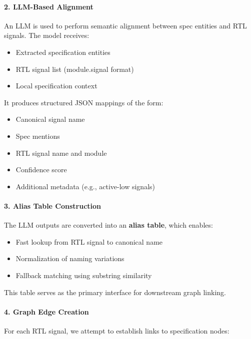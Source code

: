 \documentclass[12pt,a4paper]{article}
\begin{document}
\paragraph{2. LLM-Based Alignment}

An LLM is used to perform semantic alignment between spec entities and RTL
signals. The model receives:

\begin{itemize}[leftmargin=*]
  \item Extracted specification entities
  \item RTL signal list (module.signal format)
  \item Local specification context
\end{itemize}

It produces structured JSON mappings of the form:

\begin{itemize}[leftmargin=*]
  \item Canonical signal name
  \item Spec mentions
  \item RTL signal name and module
  \item Confidence score
  \item Additional metadata (e.g., active-low signals)
\end{itemize}

\paragraph{3. Alias Table Construction}

The LLM outputs are converted into an \textbf{alias table}, which enables:

\begin{itemize}[leftmargin=*]
  \item Fast lookup from RTL signal to canonical name
  \item Normalization of naming variations
  \item Fallback matching using substring similarity
\end{itemize}

This table serves as the primary interface for downstream graph linking.

\paragraph{4. Graph Edge Creation}

For each RTL signal, we attempt to establish links to specification nodes:
\end{document}
